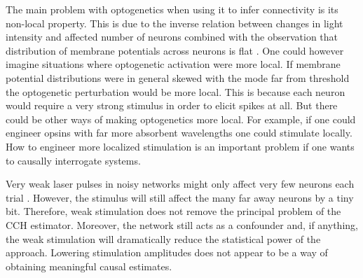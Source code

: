 \documentclass[11pt]{article}
\begin{document}


The main problem with optogenetics when using it to infer connectivity is its non-local property. This is due to the inverse relation between changes in light intensity and affected number of neurons combined with the observation that distribution of membrane potentials across neurons is flat \citep{destexhe1999impact,rudolph2006use,pare1998impact}. One could however imagine situations where optogenetic activation were more local. If membrane potential distributions were in general skewed with the mode far from threshold the optogenetic perturbation would be more local. This is because each neuron would require a very strong stimulus in order to  elicit spikes at all. But there could be other ways of making optogenetics more local. For example, if one could engineer opsins with far more absorbent wavelengths one could stimulate locally. How to engineer more localized stimulation is an important problem if one wants to causally interrogate systems.

Very weak laser pulses in noisy networks might only affect very few neurons each trial \citep{English2017}. However, the stimulus will still affect the many far away neurons by a tiny bit. Therefore, weak stimulation does not remove the principal problem of the CCH estimator. Moreover, the network still acts as a confounder and, if anything, the weak stimulation will dramatically reduce the statistical power of the approach. Lowering stimulation amplitudes does not appear to be a way of obtaining meaningful causal estimates.
\end{document}
